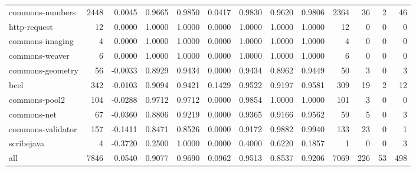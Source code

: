 \begin{table*}
\begin{tabular}{lrrrrrrrrrrrr}
        commons-numbers &  2448 &      0.0045 &  0.9665 &     0.9850 &     0.0417 &  0.9830 &     0.9620 &   0.9806 &  2364 &   36 &   2 &   46 \\
           http-request &    12 &      0.0000 &  1.0000 &     1.0000 &     0.0000 &  1.0000 &     1.0000 &   1.0000 &    12 &    0 &   0 &    0 \\
        commons-imaging &     4 &      0.0000 &  1.0000 &     1.0000 &     0.0000 &  1.0000 &     1.0000 &   1.0000 &     4 &    0 &   0 &    0 \\
         commons-weaver &     6 &      0.0000 &  1.0000 &     1.0000 &     0.0000 &  1.0000 &     1.0000 &   1.0000 &     6 &    0 &   0 &    0 \\
       commons-geometry &    56 &     -0.0033 &  0.8929 &     0.9434 &     0.0000 &  0.9434 &     0.8962 &   0.9449 &    50 &    3 &   0 &    3 \\
                   bcel &   342 &     -0.0103 &  0.9094 &     0.9421 &     0.1429 &  0.9522 &     0.9197 &   0.9581 &   309 &   19 &   2 &   12 \\
          commons-pool2 &   104 &     -0.0288 &  0.9712 &     0.9712 &     0.0000 &  0.9854 &     1.0000 &   1.0000 &   101 &    3 &   0 &    0 \\
            commons-net &    67 &     -0.0360 &  0.8806 &     0.9219 &     0.0000 &  0.9365 &     0.9166 &   0.9562 &    59 &    5 &   0 &    3 \\
      commons-validator &   157 &     -0.1411 &  0.8471 &     0.8526 &     0.0000 &  0.9172 &     0.9882 &   0.9940 &   133 &   23 &   0 &    1 \\
             scribejava &     4 &     -0.3720 &  0.2500 &     1.0000 &     0.0000 &  0.4000 &     0.6220 &   0.1857 &     1 &    0 &   0 &    3 \\
                    all &  7846 &      0.0540 &  0.9077 &     0.9690 &     0.0962 &  0.9513 &     0.8537 &   0.9206 &  7069 &  226 &  53 &  498 \\
\bottomrule
\end{tabular}
\end{table*}
